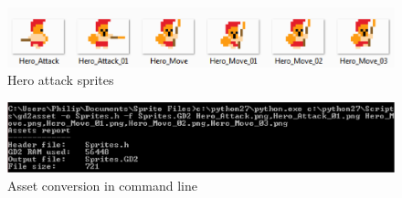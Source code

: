 \begin{figure}[h]
  \centering
  \includegraphics[scale=1]{Figures/HeroAttack}
  \caption{Hero attack sprites}
  \label{fig:Hero_Attak}
\end{figure}

\begin{figure}[h]
  \centering
  \includegraphics[scale=0.95]{Figures/Asset_cmd}
  \caption{Asset conversion in command line}
  \label{fig:asset_cmd}
\end{figure}


